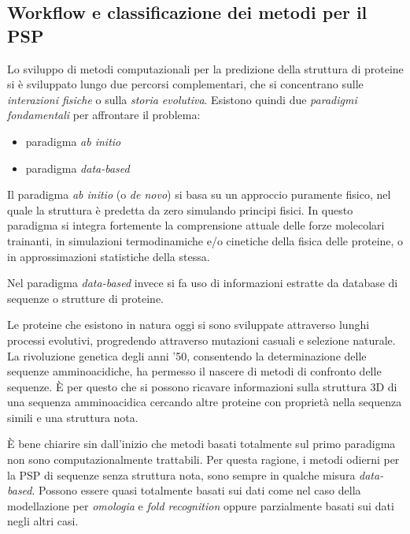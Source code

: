 \subsection{Workflow e classificazione dei metodi per il PSP} \label{sec:workflow-psp}
{

Lo sviluppo di metodi computazionali per la predizione della struttura di proteine si è sviluppato lungo due percorsi complementari, che si concentrano sulle \textit{interazioni fisiche} o sulla \textit{storia evolutiva}. Esistono quindi due \textit{paradigmi fondamentali} per affrontare il problema:
\begin{itemize}
	\item paradigma \textit{ab initio}
	\item paradigma \textit{data-based}
\end{itemize}

Il paradigma \textit{ab initio} (o \textit{de novo}) si basa su un approccio puramente fisico, nel quale la struttura è predetta da zero simulando principi fisici. In questo paradigma si integra fortemente la comprensione attuale delle forze molecolari trainanti, in simulazioni termodinamiche e/o cinetiche della fisica delle proteine, o in approssimazioni statistiche della stessa.

\par Nel paradigma \textit{data-based} invece si fa uso di informazioni estratte da database di sequenze o strutture di proteine. 

\par Le proteine che esistono in natura oggi si sono sviluppate attraverso lunghi processi evolutivi, progredendo attraverso mutazioni casuali e selezione naturale. La rivoluzione genetica degli anni '50, consentendo la determinazione delle sequenze amminoacidiche, ha permesso il nascere di metodi di confronto delle sequenze. È per questo che si possono ricavare informazioni sulla struttura 3D di una sequenza amminoacidica cercando altre proteine con proprietà nella sequenza simili e una struttura nota.\\

\par È bene chiarire sin dall'inizio che metodi basati totalmente sul primo paradigma non sono computazionalmente trattabili. Per questa ragione, i metodi odierni per la PSP di sequenze senza struttura nota, sono sempre in qualche misura \textit{data-based}. Possono essere quasi totalmente basati sui dati come nel caso della modellazione per \textit{omologia} e \textit{fold recognition} oppure parzialmente basati sui dati negli altri casi.

}
